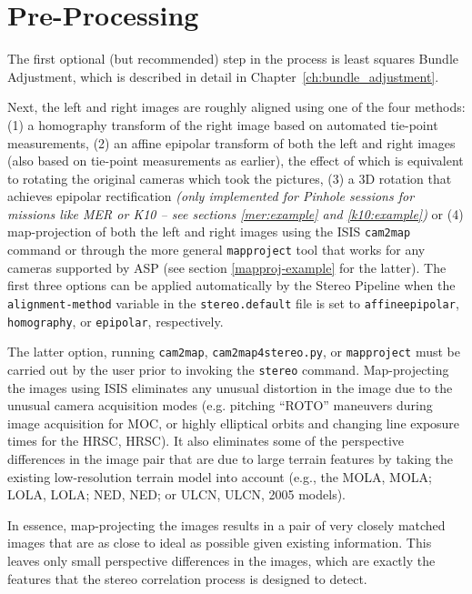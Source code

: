\section{Pre-Processing}

The first optional (but recommended) step in the process is least
squares Bundle Adjustment, which is described in detail in
Chapter~\ref{ch:bundle_adjustment}.

Next, the left and right images are roughly aligned using one of the
four methods: (1) a homography transform of the right image based on
automated tie-point measurements, (2) an affine epipolar transform of
both the left and right images (also based on tie-point measurements as
earlier), the effect of which is equivalent to rotating the original
cameras which took the pictures, (3) a 3D rotation that achieves
epipolar rectification {\it(only implemented for Pinhole sessions for
missions like MER or K10 -- see sections \ref{mer:example} and
\ref{k10:example})} or (4) map-projection of both the left and right
images using the \ac{ISIS} \texttt{cam2map} command or through the more
general \texttt{mapproject} tool that works for any cameras supported by
ASP (see section \ref{mapproj-example} for the latter).  The first three
options can be applied automatically by the Stereo Pipeline when the
\texttt{alignment-method} variable in the \texttt{stereo.default} file
is set to \texttt{affineepipolar}, \texttt{homography}, or
\texttt{epipolar}, respectively.

The latter option, running {\tt cam2map}, {\tt cam2map4stereo.py}, or
{\tt mapproject} must be carried out by the user prior to
invoking the {\tt stereo} command.  Map-projecting the images using
\ac{ISIS} eliminates any unusual distortion in the image due to the
unusual camera acquisition modes (e.g. pitching ``ROTO'' maneuvers
during image acquisition for \ac{MOC}, or highly elliptical orbits and
changing line exposure times for the \acl{HRSC}, \acs{HRSC}).  It also
eliminates some of the perspective differences in the image pair that
are due to large terrain features by taking the existing low-resolution
terrain model into account (e.g., the \acl{MOLA}, \acs{MOLA};
\acl{LOLA}, \acs{LOLA}; \acl {NED}, \acs {NED}; or \acl{ULCN},
\acs{ULCN}, 2005 models).

In essence, map-projecting the images results in a pair of very
closely matched images that are as close to ideal as possible given
existing information. This leaves only small perspective differences
in the images, which are exactly the features that the stereo
correlation process is designed to detect.

